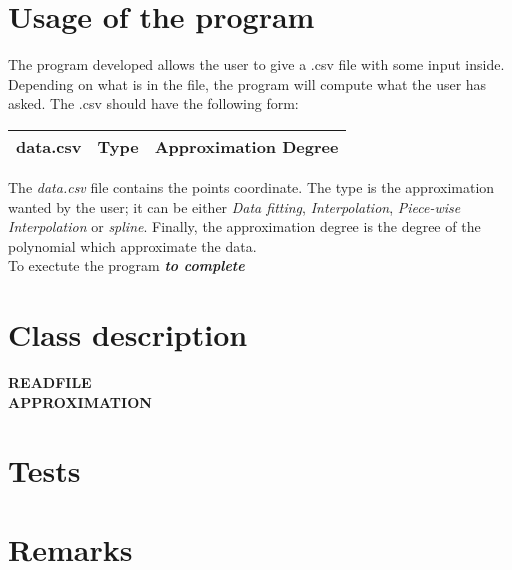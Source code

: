 \documentclass[12pt]{article}
\begin{document}
 \section{Usage of the program}
 The program developed allows the user to give a .csv file with some input inside. Depending on what is in the file, the program will compute what the user has asked. The .csv should have the following form:\\
 \begin{center}
 \begin{tabular}{|c|c|c|}
 \hline
data.csv  & Type & Approximation Degree \\
\hline
\end{tabular} 
 \end{center}
 The \emph{data.csv} file contains the points coordinate. The type is the approximation wanted by the user; it can be either \emph{Data fitting}, \emph{Interpolation}, \emph{Piece-wise Interpolation} or \emph{spline}. Finally, the approximation degree  is the degree of the polynomial which approximate the data.\\
To exectute the program \textbf{\emph{to complete}}

\section{Class description}
\textbf{READFILE}\\
\textbf{APPROXIMATION}\\

\section{Tests}

\section{Remarks}




 
\end{document}
